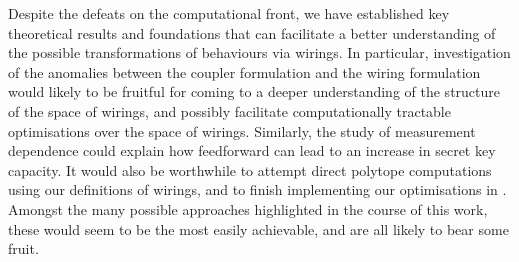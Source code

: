 \documentclass[10pt, a4paper]{article}
\numberwithin{equation}{section} %
\theoremstyle{definition}
\theoremstyle{plain}
\newcommand{\?}{\mathrel{?}} %
\begin{document}
                        Despite the defeats on the computational front, we have established key theoretical results and foundations that can facilitate a better understanding of the possible transformations of behaviours via wirings. In particular, investigation of the anomalies between the coupler formulation and the wiring formulation would likely to be fruitful for coming to a deeper understanding of the structure of the space of wirings, and possibly facilitate computationally tractable optimisations over the space of wirings. Similarly, the study of measurement dependence could explain how feedforward can lead to an increase in secret key capacity. It would also be worthwhile to attempt direct polytope computations using our definitions of wirings, and to finish implementing our optimisations in . Amongst the many possible approaches highlighted in the course of this work, these would seem to be the most easily achievable, and are all likely to bear some fruit.

                        \clearpage

                        \printbibliography{}
                        \clearpage
\end{document}
